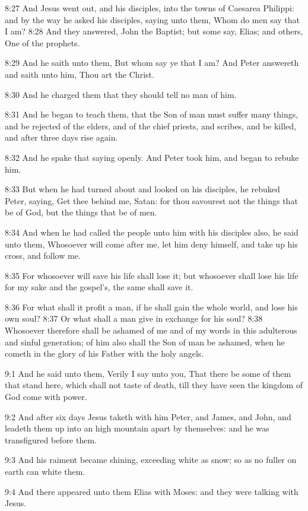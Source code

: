 8:27 And Jesus went out, and his disciples, into the towns of Caesarea Philippi: and by the way he asked his disciples, saying unto them, Whom do men say that I am?  8:28 And they answered, John the Baptist; but some say, Elias; and others, One of the prophets.

8:29 And he saith unto them, But whom say ye that I am? And Peter answereth and saith unto him, Thou art the Christ.

8:30 And he charged them that they should tell no man of him.

8:31 And he began to teach them, that the Son of man must suffer many things, and be rejected of the elders, and of the chief priests, and scribes, and be killed, and after three days rise again.

8:32 And he spake that saying openly. And Peter took him, and began to rebuke him.

8:33 But when he had turned about and looked on his disciples, he rebuked Peter, saying, Get thee behind me, Satan: for thou savourest not the things that be of God, but the things that be of men.

8:34 And when he had called the people unto him with his disciples also, he said unto them, Whosoever will come after me, let him deny himself, and take up his cross, and follow me.

8:35 For whosoever will save his life shall lose it; but whosoever shall lose his life for my sake and the gospel's, the same shall save it.

8:36 For what shall it profit a man, if he shall gain the whole world, and lose his own soul?  8:37 Or what shall a man give in exchange for his soul?  8:38 Whosoever therefore shall be ashamed of me and of my words in this adulterous and sinful generation; of him also shall the Son of man be ashamed, when he cometh in the glory of his Father with the holy angels.

9:1 And he said unto them, Verily I say unto you, That there be some of them that stand here, which shall not taste of death, till they have seen the kingdom of God come with power.

9:2 And after six days Jesus taketh with him Peter, and James, and John, and leadeth them up into an high mountain apart by themselves: and he was transfigured before them.

9:3 And his raiment became shining, exceeding white as snow; so as no fuller on earth can white them.

9:4 And there appeared unto them Elias with Moses: and they were talking with Jesus.

